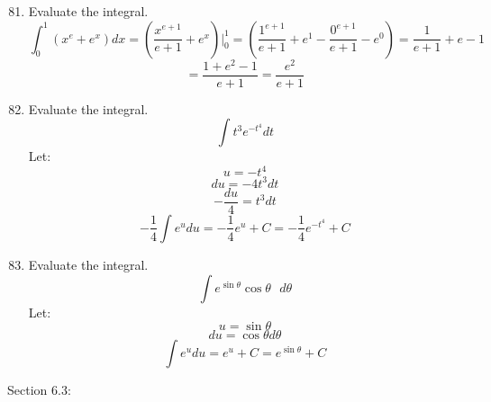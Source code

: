 \documentclass[12pt]{article}
\begin{document}
\begin{enumerate}
\setcounter{enumi}{80}
        \item Evaluate the integral.
        \[\int_0^1 (x^e + e^x) dx = (\frac{x^{e+1}}{e+1} + e^x)|_0^1 =  (\frac{1^{e+1}}{e+1} + e^1 - \frac{0^{e+1}}{e+1} - e^0) = \frac{1}{e+1} + e - 1 \]
        \[= \frac{1 + e^2 - 1}{e+1} = \frac{e^2}{e+1}\]

\setcounter{enumi}{83}
        \item Evaluate the integral.
        \[\int t^3e^{-t^4}dt\]
        Let:
        \[u = -t^4\]
        \[du = -4t^3dt\]
        \[-\frac{du}{4} = t^3dt\]
        \[-\frac{1}{4}\int e^{u}du = -\frac{1}{4}e^u + C = -\frac{1}{4}e^{-t^4} + C\]

\setcounter{enumi}{89}
        \item Evaluate the integral.
        \[\int e^{\sin \theta} \cos \theta \text{ } d\theta\]
        Let:
        \[u = \sin \theta\]
        \[du = \cos \theta d \theta\]
        \[\int e^u du = e^u + C = e^{\sin \theta} + C\]
\end{enumerate}

Section 6.3:
\end{document}
